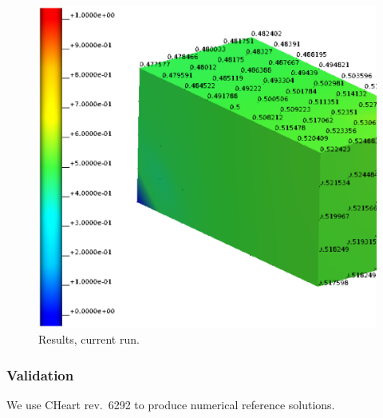 \begin{figure}[h!]
    \centering 
    \includegraphics[width=0.9\columnwidth]{examples/example-0001/doc/figures/current_run_l2x1x1_n8x4x4_i1_s0.eps} 
    \caption{Results, current run.}
    \label{example-0001-current-run-fig}
\end{figure}
%
%
\subsubsection{Validation}
%
We use CHeart rev.\ 6292 to produce numerical reference solutions.
%
